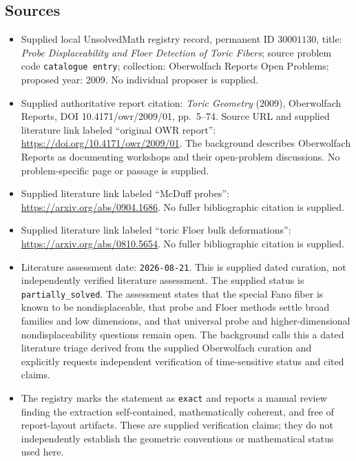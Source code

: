 \documentclass[11pt]{article}
\begin{document}
\subsection{Sources}
\begin{itemize}
\item Supplied local UnsolvedMath registry record, permanent ID \(30001130\), title: \emph{Probe Displaceability and Floer Detection of Toric Fibers}; source problem code \texttt{catalogue entry}; collection: Oberwolfach Reports Open Problems; proposed year: 2009. No individual proposer is supplied.
\item Supplied authoritative report citation: \emph{Toric Geometry} (2009), Oberwolfach Reports, DOI 10.4171/owr/2009/01, pp.~5--74. Source URL and supplied literature link labeled ``original OWR report'': \url{https://doi.org/10.4171/owr/2009/01}. The background describes Oberwolfach Reports as documenting workshops and their open-problem discussions. No problem-specific page or passage is supplied.
\item Supplied literature link labeled ``McDuff probes'': \url{https://arxiv.org/abs/0904.1686}. No fuller bibliographic citation is supplied.
\item Supplied literature link labeled ``toric Floer bulk deformations'': \url{https://arxiv.org/abs/0810.5654}. No fuller bibliographic citation is supplied.
\item Literature assessment date: \texttt{2026-08-21}. This is supplied dated curation, not independently verified literature assessment. The supplied status is \texttt{partially\_solved}. The assessment states that the special Fano fiber is known to be nondisplaceable, that probe and Floer methods settle broad families and low dimensions, and that universal probe and higher-dimensional nondisplaceability questions remain open. The background calls this a dated literature triage derived from the supplied Oberwolfach curation and explicitly requests independent verification of time-sensitive status and cited claims.
\item The registry marks the statement as \texttt{exact} and reports a manual review finding the extraction self-contained, mathematically coherent, and free of report-layout artifacts. These are supplied verification claims; they do not independently establish the geometric conventions or mathematical status used here.
\end{itemize}
\end{document}

